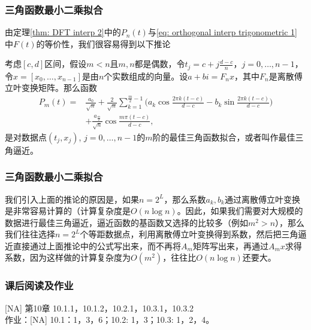 \documentclass[10pt]{beamer}
\begin{document}
\begin{frame}
\frametitle{三角函数最小二乘拟合}
由定理\ref{thm: DFT interp 2}中的$P_n(t)$与\eqref{eq: orthogonal interp trigonometric 1} 中$F(t)$的等价性，我们很容易得到以下推论
\begin{theorem}
考虑$[c,d]$区间，假设$m<n$且$m,n$都是偶数，令$t_j = c + j\frac{d-c}{n}$，$j = 0, \ldots, n-1$，令$x = [x_0, \ldots, x_{n-1}]$是由$n$个实数组成的向量。设$a + b i = F_n x$，其中$F_n$是离散傅立叶变换矩阵。那么函数
\begin{align}
P_m(t) = &  \frac{a_0}{\sqrt{n}} + \frac{2}{\sqrt{n}} \sum_{k=1}^{\frac{m}{2}-1} \big(a_k \cos \frac{2 \pi k (t-c)}{d-c} - b_k \sin \frac{2 \pi k (t-c)}{d-c}  \big) \nonumber \\
       &+ \frac{a_{\frac{m}{2}}}{\sqrt{n}} \cos \frac{m\pi(t-c)}{d-c},
\end{align}
是对数据点$(t_j, x_j)$, $j = 0, \ldots, n-1$的$m$阶的最佳三角函数拟合，或者叫作最佳三角逼近。
\end{theorem}
\end{frame}


\begin{frame}
\frametitle{三角函数最小二乘拟合}
我们引入上面的推论的原因是，如果$n = 2^L$，那么系数$a_k, b_k$通过离散傅立叶变换是非常容易计算的（计算复杂度是$O(n\log n)$。因此，如果我们需要对大规模的数据进行最佳三角逼近，逼近函数的基函数又选择的比较多（例如$m^2 >n$），那么我们往往选择$n = 2^L$个等距数据点，利用离散傅立叶变换得到系数，然后把三角逼近直接通过上面推论中的公式写出来，而不再将$A_m$矩阵写出来，再通过$A_mx$求得系数，因为这样做的计算复杂度为$O(m^2)$，往往比$O(n\log n)$还要大。
\end{frame}





\begin{frame}
\frametitle{课后阅读及作业}
[NA] 第10章 10.1.1，10.1.2，10.2.1，10.3.1，10.3.2\\
作业：[NA] 10.1：1，3，6；10.2: 1，3；10.3: 1，2，4。


\end{frame}
\end{document}
